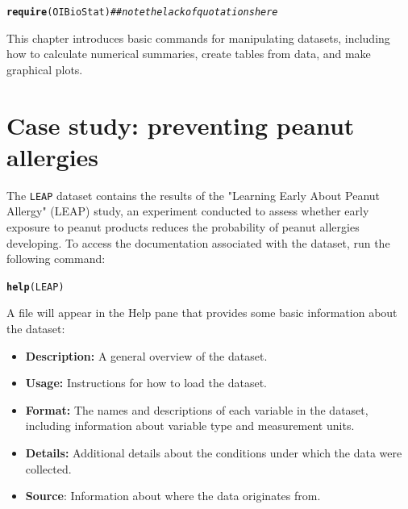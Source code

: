 \documentclass{article}\usepackage[]{graphicx}\usepackage[]{color}
\makeatletter
\newcommand{\hlcom}[1]{\textcolor[rgb]{0.678,0.584,0.686}{\textit{#1}}}%
\newcommand{\hlstd}[1]{\textcolor[rgb]{0.345,0.345,0.345}{#1}}%
\newcommand{\hlkwd}[1]{\textcolor[rgb]{0.737,0.353,0.396}{\textbf{#1}}}%
\newenvironment{kframe}{%
 \def\at@end@of@kframe{}%
 \ifinner\ifhmode%
  \def\at@end@of@kframe{\end{minipage}}%
  \begin{minipage}{\columnwidth}%
 \fi\fi%
 \def\FrameCommand##1{\hskip\@totalleftmargin \hskip-\fboxsep
 \colorbox{shadecolor}{##1}\hskip-\fboxsep
     \hskip-\linewidth \hskip-\@totalleftmargin \hskip\columnwidth}%
 \MakeFramed {\advance\hsize-\width
   \@totalleftmargin\z@ \linewidth\hsize
   \@setminipage}}%
 {\par\unskip\endMakeFramed%
 \at@end@of@kframe}
\newenvironment{knitrout}{}{} %
\makeatother
\begin{document}
\begin{knitrout}
\color{fgcolor}\begin{kframe}
\begin{alltt}
\hlkwd{require}\hlstd{(OIBioStat)} \hlcom{## note the lack of quotations here}
\end{alltt}
\end{kframe}
\end{knitrout}


This chapter introduces basic commands for manipulating datasets, including how to calculate numerical summaries, create tables from data, and make graphical plots. 

\section{Case study: preventing peanut allergies}

The \texttt{LEAP} dataset contains the results of the "Learning Early About Peanut Allergy" (LEAP) study, an experiment conducted to assess whether early exposure to peanut products reduces the probability of peanut allergies developing. To access the documentation associated with the dataset, run the following command: 

\begin{knitrout}
\color{fgcolor}\begin{kframe}
\begin{alltt}
\hlkwd{help}\hlstd{(LEAP)}
\end{alltt}
\end{kframe}
\end{knitrout}

A file will appear in the Help pane that provides some basic information about the dataset:

\begin{itemize}
\item \textbf{Description:} A general overview of the dataset. 
\item \textbf{Usage:} Instructions for how to load the dataset. 
\item \textbf{Format:} The names and descriptions of each variable in the dataset, including information about variable type and measurement units.
\item \textbf{Details:} Additional details about the conditions under which the data were collected.
\item \textbf{Source}: Information about where the data originates from.
\end{itemize}
\end{document}
